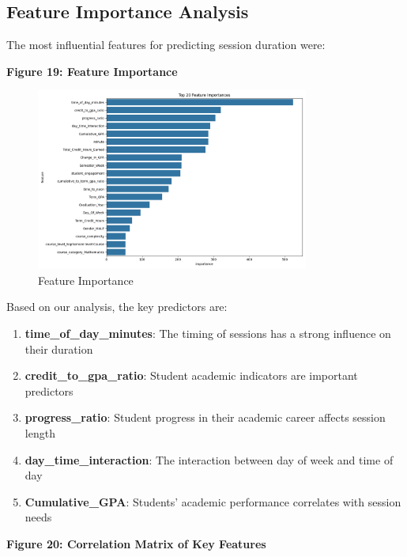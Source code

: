 \documentclass[12pt,letterpaper]{article}
\begin{document}
\subsection{Feature Importance Analysis}

The most influential features for predicting session duration were:

\textbf{Figure 19: Feature Importance}

\begin{figure}[H]
    \centering
    \includegraphics[width=0.8\textwidth]{duration_prediction/visualizations/feature_importance.png}
    \caption{Feature Importance}
\end{figure}

Based on our analysis, the key predictors are:

\begin{enumerate}
    \item \textbf{time\_of\_day\_minutes}: The timing of sessions has a strong influence on their duration
    \item \textbf{credit\_to\_gpa\_ratio}: Student academic indicators are important predictors
    \item \textbf{progress\_ratio}: Student progress in their academic career affects session length
    \item \textbf{day\_time\_interaction}: The interaction between day of week and time of day
    \item \textbf{Cumulative\_GPA}: Students' academic performance correlates with session needs
\end{enumerate}

\textbf{Figure 20: Correlation Matrix of Key Features}
\end{document}
